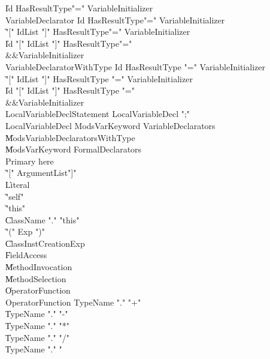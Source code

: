 \begin{grammar}

    \|   Id  HasResultType\opt  \xcd"="  VariableInitializer\\
 VariableDeclarator  \:   Id  HasResultType\opt  \xcd"="  VariableInitializer\\
    \|   \xcd"["  IdList  \xcd"]"  HasResultType\opt  \xcd"="  VariableInitializer\\
    \|   Id  \xcd"["  IdList  \xcd"]"  HasResultType\opt  \xcd"="\\
          &&VariableInitializer\\
 VariableDeclaratorWithType  \:   Id  HasResultType  \xcd"="  VariableInitializer\\
    \|   \xcd"["  IdList  \xcd"]"  HasResultType  \xcd"="  VariableInitializer\\
    \|   Id  \xcd"["  IdList  \xcd"]"  HasResultType  \xcd"="\\
          &&VariableInitializer\\
 LocalVariableDeclStatement  \:   LocalVariableDecl  \xcd";"\\
 LocalVariableDecl  \:   Mods\opt  VarKeyword  VariableDeclarators\\
    \|   Mods\opt  VariableDeclaratorsWithType\\
    \|   Mods\opt  VarKeyword  FormalDeclarators\\
 Primary  \:   here\\
    \|   \xcd"["  ArgumentList\opt  \xcd"]"\\
    \|   Literal\\
    \|   \xcd"self"\\
    \|   \xcd"this"\\
    \|   ClassName  \xcd"."  \xcd"this"\\
    \|   \xcd"("  Exp  \xcd")"\\
    \|   ClassInstCreationExp\\
    \|   FieldAccess\\
    \|   MethodInvocation\\
    \|   MethodSelection\\
    \|   OperatorFunction\\
 OperatorFunction  \:   TypeName  \xcd"."  \xcd"+"\\
    \|   TypeName  \xcd"."  \xcd"-"\\
    \|   TypeName  \xcd"."  \xcd"*"\\
    \|   TypeName  \xcd"."  \xcd"/"\\
    \|   TypeName  \xcd"."  \xcd"%

\end{grammar}
